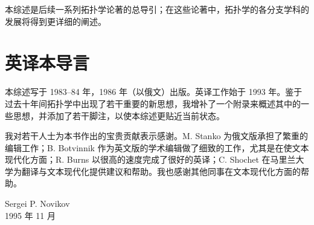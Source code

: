 本综述是后续一系列拓扑学论著的总导引；在这些论著中，拓扑学的各分支学科的发展将得到更详细的阐述。

\chapter*{英译本导言}

本综述写于 1983–84 年，1986 年（以俄文）出版。英译工作始于 1993 年。鉴于过去十年间拓扑学中出现了若干重要的新思想，我增补了一个附录来概述其中的一些思想，并添加了若干脚注，以使本综述更贴近当前状态。

我对若干人士为本书作出的宝贵贡献表示感谢。M. Stanko 为俄文版承担了繁重的编辑工作；B. Botvinnik 作为英文版的学术编辑做了细致的工作，尤其是在使文本现代化方面；R. Burns 以很高的速度完成了很好的英译；C. Shochet 在马里兰大学为翻译与文本现代化提供建议和帮助。我也感谢其他同事在文本现代化方面的帮助。

\vspace{1.2em}
\begin{flushright}
Sergei P. Novikov\\
1995 年 11 月
\end{flushright}

